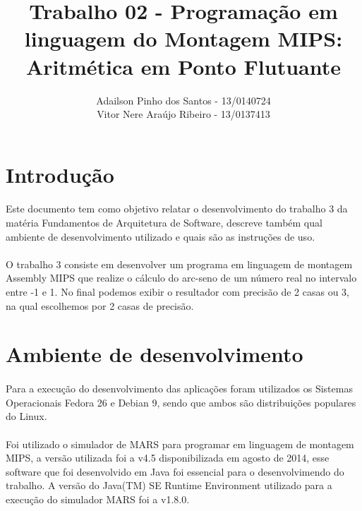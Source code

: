 \documentclass[a4paper, 12pt]{article}
\begin{document}
\title{Trabalho 02 - Programa\c{c}\~ao em linguagem do Montagem MIPS: Aritm\'etica em Ponto Flutuante}
\author{Adailson Pinho dos Santos - 13/0140724\\
Vitor Nere Ara\'ujo Ribeiro - 13/0137413}
\date{}
\maketitle

\newpage

\tableofcontents

\newpage

\section{Introdu\c{c}\~ao}
	\paragraph{}	Este documento tem como objetivo relatar o desenvolvimento do trabalho 3 da mat\'eria Fundamentos de Arquitetura de Software, descreve tamb\'em qual ambiente de desenvolvimento utilizado e quais s\~ao as instru\c{c}\~oes de uso. 
	\paragraph{}	O trabalho 3 consiste em desenvolver um programa em linguagem de montagem Assembly MIPS que realize o c\'alculo do arc-seno de um n\'umero real no intervalo entre -1 e 1. No final podemos exibir o resultador com precisão de 2 casas ou 3, na qual escolhemos por 2 casas de precis\~ao. 
\section{Ambiente de desenvolvimento}
    \paragraph{}	Para a execu\c{c}\~ao do desenvolvimento das aplica\c{c}\~oes foram utilizados os Sistemas Operacionais Fedora 26 e Debian 9, sendo que ambos s\~ao distribui\c{c}\~oes populares do Linux. 
    \paragraph{}	Foi utilizado o simulador de MARS para programar em linguagem de montagem MIPS, a vers\~ao utilizada foi a v4.5 disponibilizada em agosto de 2014, esse software que foi desenvolvido em Java foi essencial para o desenvolvimendo do trabalho. A vers\~ao do Java(TM) SE Runtime Environment utilizado para a execu\c{c}\~ao do simulador MARS foi a v1.8.0.
\end{document}
